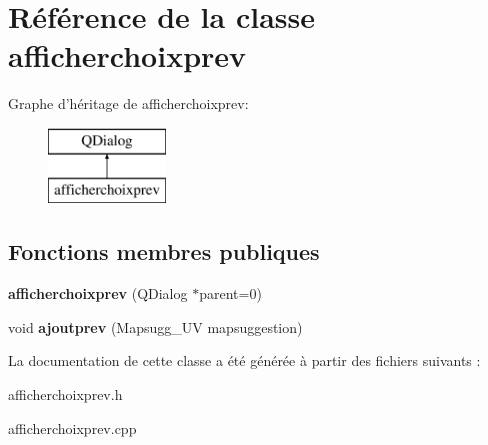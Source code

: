 \hypertarget{classafficherchoixprev}{\section{Référence de la classe afficherchoixprev}
\label{classafficherchoixprev}
}
Graphe d'héritage de afficherchoixprev\+:\begin{figure}[H]
\begin{center}
\leavevmode
\includegraphics[height=2.000000cm]{classafficherchoixprev}
\end{center}
\end{figure}
\subsection*{Fonctions membres publiques}
\begin{DoxyCompactItemize}
\item 
\hypertarget{classafficherchoixprev_a02f77cdfa3f0a2a26e92785318974685}{{\bfseries afficherchoixprev} (Q\+Dialog $\ast$parent=0)}\label{classafficherchoixprev_a02f77cdfa3f0a2a26e92785318974685}

\item 
\hypertarget{classafficherchoixprev_af9d7d017f015f7f9931b0cc1bcd6625b}{void {\bfseries ajoutprev} (Mapsugg\+\_\+\+U\+V mapsuggestion)}\label{classafficherchoixprev_af9d7d017f015f7f9931b0cc1bcd6625b}

\end{DoxyCompactItemize}


La documentation de cette classe a été générée à partir des fichiers suivants \+:\begin{DoxyCompactItemize}
\item 
afficherchoixprev.\+h\item 
afficherchoixprev.\+cpp\end{DoxyCompactItemize}
